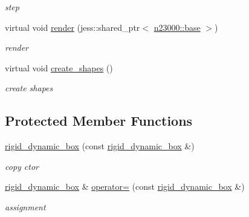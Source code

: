 \begin{DoxyCompactItemize}
\begin{DoxyCompactList}\small\item\em step \item\end{DoxyCompactList}\item 
virtual void \hyperlink{classnebula_1_1content_1_1actor_1_1physics_1_1rigid__dynamic__box_a4125f63982e9dfee274ab2721893bc28}{render} (jess::shared\_\-ptr$<$ \hyperlink{classnebula_1_1platform_1_1renderer_1_1base}{n23000::base} $>$)
\begin{DoxyCompactList}\small\item\em render \item\end{DoxyCompactList}\item 
virtual void \hyperlink{classnebula_1_1content_1_1actor_1_1physics_1_1rigid__dynamic__box_a77dc2beadcdfda10eeb5ef1abed6ee5e}{create\_\-shapes} ()
\begin{DoxyCompactList}\small\item\em create shapes \item\end{DoxyCompactList}\end{DoxyCompactItemize}
\subsection*{Protected Member Functions}
\begin{DoxyCompactItemize}
\item 
\hyperlink{classnebula_1_1content_1_1actor_1_1physics_1_1rigid__dynamic__box_a020c25e01a20e62f4ad1bd3b3e0f5a76}{rigid\_\-dynamic\_\-box} (const \hyperlink{classnebula_1_1content_1_1actor_1_1physics_1_1rigid__dynamic__box}{rigid\_\-dynamic\_\-box} \&)
\begin{DoxyCompactList}\small\item\em copy ctor \item\end{DoxyCompactList}\item 
\hyperlink{classnebula_1_1content_1_1actor_1_1physics_1_1rigid__dynamic__box}{rigid\_\-dynamic\_\-box} \& \hyperlink{classnebula_1_1content_1_1actor_1_1physics_1_1rigid__dynamic__box_a26c54eacc3d28dd0b88e7a67fe6635f7}{operator=} (const \hyperlink{classnebula_1_1content_1_1actor_1_1physics_1_1rigid__dynamic__box}{rigid\_\-dynamic\_\-box} \&)
\begin{DoxyCompactList}\small\item\em assignment \item\end{DoxyCompactList}\end{DoxyCompactItemize}


